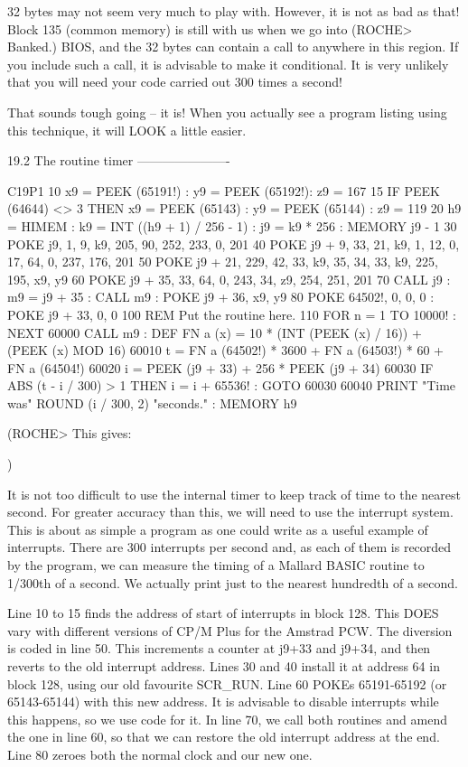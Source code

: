 32  bytes  may not seem very much to play with. However, it is not as  bad  as 
that!  Block  135  (common memory) is still with us when we  go  into  (ROCHE> 
Banked.) BIOS, and the 32 bytes can contain a call to anywhere in this region. 
If you include such a call, it is advisable to make it conditional. It is very 
unlikely that you will need your code carried out 300 times a second!

That  sounds  tough going -- it is! When you actually see  a  program  listing 
using this technique, it will LOOK a little easier.


19.2 The routine timer
----------------------

        C19P1
        10 x9 = PEEK (65191!) : y9 = PEEK (65192!): z9 = 167
        15  IF PEEK (64644) <> 3 THEN x9 = PEEK (65143) : y9 = PEEK (65144)  : 
z9 = 119
        20 h9 = HIMEM : k9 = INT ((h9 + 1) / 256 - 1) : j9 = k9 * 256 : MEMORY 
j9 - 1
        30 POKE j9, 1, 9, k9, 205, 90, 252, 233, 0, 201
        40 POKE j9 + 9, 33, 21, k9, 1, 12, 0, 17, 64, 0, 237, 176, 201
        50 POKE j9 + 21, 229, 42, 33, k9, 35, 34, 33, k9, 225, 195, x9, y9
        60 POKE j9 + 35, 33, 64, 0, 243, 34, z9, 254, 251, 201
        70 CALL j9 : m9 = j9 + 35 : CALL m9 : POKE j9 + 36, x9, y9
        80 POKE 64502!, 0, 0, 0 : POKE j9 + 33, 0, 0
        100 REM Put the routine here.
        110 FOR n = 1 TO 10000! : NEXT
        60000 CALL m9 : DEF FN a (x) = 10 * (INT (PEEK (x) / 16)) + (PEEK  (x) 
MOD 16)
        60010 t = FN a (64502!) * 3600 + FN a (64503!) * 60 + FN a (64504!)
        60020 i = PEEK (j9 + 33) + 256 * PEEK (j9 + 34)
        60030 IF ABS (t - i / 300) > 1 THEN i = i + 65536! : GOTO 60030
        60040 PRINT "Time was" ROUND (i / 300, 2) "seconds." : MEMORY h9

(ROCHE> This gives:

$$$$
)

It is not too difficult to use the internal timer to keep track of time to the 
nearest  second.  For  greater accuracy than this, we will  need  to  use  the 
interrupt  system. This is about as simple a program as one could write  as  a 
useful example of interrupts. There are 300 interrupts per second and, as each 
of  them  is recorded by the program, we can measure the timing of  a  Mallard 
BASIC  routine to 1/300th of a second. We actually print just to  the  nearest 
hundredth of a second.

Line 10 to 15 finds the address of start of interrupts in block 128. This DOES 
vary  with different versions of CP/M Plus for the Amstrad PCW. The  diversion 
is  coded in line 50. This increments a counter at j9+33 and j9+34,  and  then 
reverts to the old interrupt address. Lines 30 and 40 install it at address 64 
in  block 128, using our old favourite SCR_RUN. Line 60 POKEs 65191-65192  (or 
65143-65144)  with  this new address. It is advisable  to  disable  interrupts 
while  this happens, so we use code for it. In line 70, we call both  routines 
and amend the one in line 60, so that we can restore the old interrupt address 
at the end. Line 80 zeroes both the normal clock and our new one.

